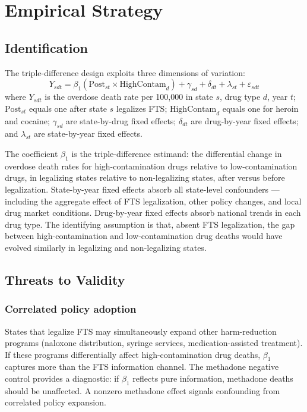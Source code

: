 \documentclass[12pt]{article}
\begin{document}
\section{Empirical Strategy}

\subsection{Identification}

The triple-difference design exploits three dimensions of variation:
\begin{equation}
Y_{sdt} = \beta_1 (\text{Post}_{st} \times \text{HighContam}_d) + \gamma_{sd} + \delta_{dt} + \lambda_{st} + \varepsilon_{sdt}
\label{eq:ddd}
\end{equation}
where $Y_{sdt}$ is the overdose death rate per 100,000 in state $s$, drug type $d$, year $t$; $\text{Post}_{st}$ equals one after state $s$ legalizes FTS; $\text{HighContam}_d$ equals one for heroin and cocaine; $\gamma_{sd}$ are state-by-drug fixed effects; $\delta_{dt}$ are drug-by-year fixed effects; and $\lambda_{st}$ are state-by-year fixed effects.

The coefficient $\beta_1$ is the triple-difference estimand: the differential change in overdose death rates for high-contamination drugs relative to low-contamination drugs, in legalizing states relative to non-legalizing states, after versus before legalization. State-by-year fixed effects absorb all state-level confounders --- including the aggregate effect of FTS legalization, other policy changes, and local drug market conditions. Drug-by-year fixed effects absorb national trends in each drug type. The identifying assumption is that, absent FTS legalization, the gap between high-contamination and low-contamination drug deaths would have evolved similarly in legalizing and non-legalizing states.

\subsection{Threats to Validity}

\subsubsection*{Correlated policy adoption}
States that legalize FTS may simultaneously expand other harm-reduction programs (naloxone distribution, syringe services, medication-assisted treatment). If these programs differentially affect high-contamination drug deaths, $\beta_1$ captures more than the FTS information channel. The methadone negative control provides a diagnostic: if $\beta_1$ reflects pure information, methadone deaths should be unaffected. A nonzero methadone effect signals confounding from correlated policy expansion.
\end{document}
